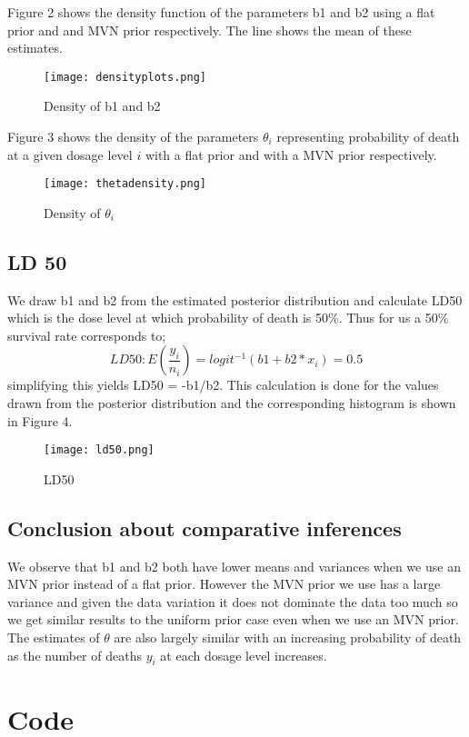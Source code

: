 \documentclass{article}
\begin{document}
Figure 2 shows the density function of the parameters b1 and b2 using a flat prior and and MVN prior respectively. The line shows the mean of these estimates.
 \begin{figure}[H]
\centering
\texttt{[image: densityplots.png]}
\caption{Density of b1 and b2}
\label{deltat}
\end{figure}

Figure 3 shows the density of the parameters $\theta_i$ representing probability of death at a given dosage level $i$ with a flat prior and with a MVN prior respectively.
 \begin{figure}[H]
\centering
\texttt{[image: thetadensity.png]}
\caption{Density of $\theta_i$}
\label{deltat}
\end{figure}
\newpage

\subsection{LD 50}
We draw b1 and b2 from the estimated posterior distribution and calculate LD50 which is the dose level at which probability of death is 50\%. Thus for us a 50\% survival rate corresponds to;
$$LD50 : E(\frac{y_i}{n_i}) = logit^{-1}(b1 + b2*x_i) = 0.5$$
simplifying this yields LD50 = -b1/b2. This calculation is done for the values drawn from the posterior distribution and the corresponding histogram is shown in Figure 4.
 \begin{figure}[H]
\centering
\texttt{[image: ld50.png]}
\caption{LD50}
\label{deltat}
\end{figure}

\subsection{Conclusion about comparative inferences}
We observe that b1 and b2 both have lower means and variances when we use an MVN prior instead of a flat prior. However the MVN prior we use has a large variance and given the data variation it does not dominate the data too much so we get similar results to the uniform prior case even when we use an MVN prior. The estimates of $\theta$ are also largely similar with an increasing probability of death as the number of deaths $y_i$ at each dosage level increases.

\section{Code}
\end{document}
